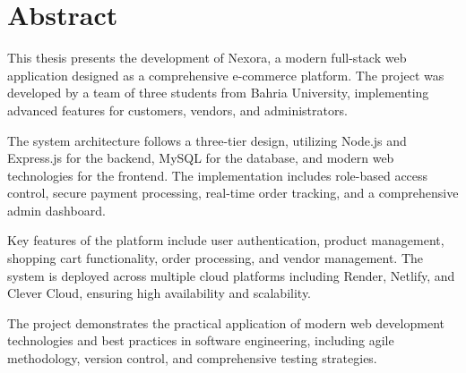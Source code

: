 \chapter*{Abstract}

This thesis presents the development of Nexora, a modern full-stack web application designed as a comprehensive e-commerce platform. The project was developed by a team of three students from Bahria University, implementing advanced features for customers, vendors, and administrators.

The system architecture follows a three-tier design, utilizing Node.js and Express.js for the backend, MySQL for the database, and modern web technologies for the frontend. The implementation includes role-based access control, secure payment processing, real-time order tracking, and a comprehensive admin dashboard.

Key features of the platform include user authentication, product management, shopping cart functionality, order processing, and vendor management. The system is deployed across multiple cloud platforms including Render, Netlify, and Clever Cloud, ensuring high availability and scalability.

The project demonstrates the practical application of modern web development technologies and best practices in software engineering, including agile methodology, version control, and comprehensive testing strategies. 